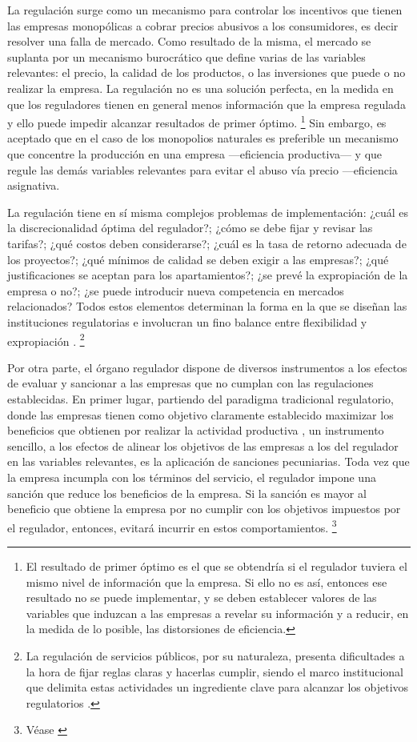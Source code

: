 \documentclass[
  12pt,
  spanish,
]{book}
\begin{document}
La regulación surge como un mecanismo para controlar los incentivos que
tienen las empresas monopólicas a cobrar precios abusivos a los
consumidores, es decir resolver una falla de mercado. Como resultado de
la misma, el mercado se suplanta por un mecanismo burocrático que define
varias de las variables relevantes: el precio, la calidad de los
productos, o las inversiones que puede o no realizar la empresa. La
regulación no es una solución perfecta, en la medida en que los
reguladores tienen en general menos información que la empresa regulada
y ello puede impedir alcanzar resultados de primer óptimo. \footnote{El
  resultado de primer óptimo es el que se obtendría si el regulador
  tuviera el mismo nivel de información que la empresa. Si ello no es
  así, entonces ese resultado no se puede implementar, y se deben
  establecer valores de las variables que induzcan a las empresas a
  revelar su información y a reducir, en la medida de lo posible, las
  distorsiones de eficiencia.} Sin embargo, es aceptado que en el caso
de los monopolios naturales es preferible un mecanismo que concentre la
producción en una empresa ---eficiencia productiva--- y que regule las
demás variables relevantes para evitar el abuso vía precio ---eficiencia
asignativa.

La regulación tiene en sí misma complejos problemas de implementación:
¿cuál es la discrecionalidad óptima del regulador?; ¿cómo se debe fijar
y revisar las tarifas?; ¿qué costos deben considerarse?; ¿cuál es la
tasa de retorno adecuada de los proyectos?; ¿qué mínimos de calidad se
deben exigir a las empresas?; ¿qué justificaciones se aceptan para los
apartamientos?; ¿se prevé la expropiación de la empresa o no?; ¿se puede
introducir nueva competencia en mercados relacionados? Todos estos
elementos determinan la forma en la que se diseñan las instituciones
regulatorias e involucran un fino balance entre flexibilidad y
expropiación \citep{Bergara2003, Spiller2013}. \footnote{La regulación
  de servicios públicos, por su naturaleza, presenta dificultades a la
  hora de fijar reglas claras y hacerlas cumplir, siendo el marco
  institucional que delimita estas actividades un ingrediente clave para
  alcanzar los objetivos regulatorios \citep{Bergara2003}.}

Por otra parte, el órgano regulador dispone de diversos instrumentos a
los efectos de evaluar y sancionar a las empresas que no cumplan con las
regulaciones establecidas. En primer lugar, partiendo del paradigma
tradicional regulatorio, donde las empresas tienen como objetivo
claramente establecido maximizar los beneficios que obtienen por
realizar la actividad productiva \citep{Armstrong2007}, un instrumento
sencillo, a los efectos de alinear los objetivos de las empresas a los
del regulador en las variables relevantes, es la aplicación de sanciones
pecuniarias. Toda vez que la empresa incumpla con los términos del
servicio, el regulador impone una sanción que reduce los beneficios de
la empresa. Si la sanción es mayor al beneficio que obtiene la empresa
por no cumplir con los objetivos impuestos por el regulador, entonces,
evitará incurrir en estos comportamientos. \footnote{Véase
  \citep{Becker1968}}
\end{document}

